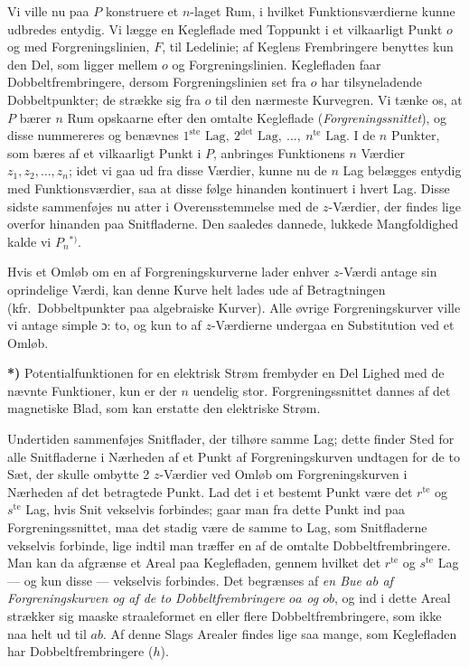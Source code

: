 \documentclass{article}
\begin{document}
Vi ville nu paa $P$ konstruere et $n$-laget Rum, i hvilket Funktionsværdierne kunne udbredes entydig. Vi lægge en Kegleflade med Toppunkt i et vilkaarligt Punkt $o$ og med Forgreningslinien, $F$, til Ledelinie; af Keglens Frembringere benyttes kun den Del, som ligger mellem $o$ og Forgreningslinien. Keglefladen faar Dobbeltfrembringere, dersom Forgreningslinien set fra $o$ har tilsyneladende Dobbeltpunkter; de strække sig fra $o$ til den nærmeste Kurvegren. Vi tænke os, at $P$ bærer $n$ Rum opskaarne efter den omtalte Kegleflade (\emph{Forgreningssnittet}), og disse nummereres og benævnes $1^{\text{ste}}\text{ Lag}, \ 2^{\text{det}}\text{ Lag}, \ \dots, \ n^{\text{te}}\text{ Lag}$. I de $n$ Punkter, som bæres af et vilkaarligt Punkt i $P$, anbringes Funktionens $n$ Værdier $z_1, z_2, \dots, z_n$; idet vi gaa ud fra disse Værdier, kunne nu de $n$ Lag belægges entydig med Funktionsværdier, saa at disse følge hinanden kontinuert i hvert Lag. Disse sidste sammenføjes nu atter i Overensstemmelse med de $z$-Værdier, der findes lige overfor hinanden paa Snitfladerne. Den saaledes dannede, lukkede Mangfoldighed kalde vi $P_n$${}^{*)}$.

Hvis et Omløb om en af Forgreningskurverne lader enhver $z$-Værdi antage sin oprindelige Værdi, kan denne Kurve helt lades ude af Betragtningen (kfr.\ Dobbeltpunkter paa algebraiske Kurver). Alle øvrige Forgreningskurver ville vi antage simple ɔ: to, og kun to af $z$-Værdierne undergaa en Substitution ved et Omløb.

\textbf{*)} Potentialfunktionen for en elektrisk Strøm frembyder en Del Lighed med de nævnte Funktioner, kun er der $n$ uendelig stor. Forgreningssnittet dannes af det magnetiske Blad, som kan erstatte den elektriske Strøm.

Undertiden sammenføjes Snitflader, der tilhøre samme Lag; dette finder Sted for alle Snitfladerne i Nærheden af et Punkt af Forgreningskurven undtagen for de to Sæt, der skulle ombytte 2 $z$-Værdier ved Omløb om Forgreningskurven i Nærheden af det betragtede Punkt. Lad det i et bestemt Punkt være det $r^{\text{te}}$ og $s^{\text{te}}$ Lag, hvis Snit vekselvis forbindes; gaar man fra dette Punkt ind paa Forgreningssnittet, maa det stadig være de samme to Lag, som Snitfladerne vekselvis forbinde, lige indtil man træffer en af de omtalte Dobbeltfrembringere. Man kan da afgrænse et Areal paa Keglefladen, gennem hvilket det $r^{\text{te}}$ og $s^{\text{te}}$ Lag --- og kun disse --- vekselvis forbindes. Det begrænses af \emph{en Bue $ab$ af Forgreningskurven og af de to Dobbeltfrembringere $oa$ og $ob$}, og ind i dette Areal strækker sig maaske straaleformet en eller flere Dobbeltfrembringere, som ikke naa helt ud til $ab$. Af denne Slags Arealer findes lige saa mange, som Keglefladen har Dobbeltfrembringere ($h$).
\end{document}
